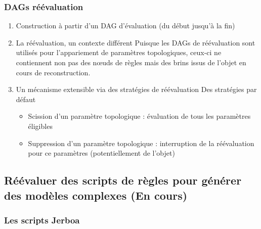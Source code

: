\documentclass[11pt]{article}
\begin{document}
\subsubsection{DAGs réévaluation}
\label{sec:orga954360}
\begin{enumerate}
\item Construction à partir d'un DAG d'évaluation (du début jusqu'à la fin)
\label{sec:org02d5b93}
\item La réévaluation, un contexte différent
\label{sec:org039e316}
Puisque les DAGs de réévaluation sont utilisés pour l'appariement de paramètres
topologiques, ceux-ci ne contiennent non pas des nœuds de règles mais des brins
issus de l'objet en cours de reconstruction.
\item Un mécanisme extensible via des stratégies de réévaluation
\label{sec:orgd4e36d0}
Des stratégies par défaut
\begin{itemize}
\item Scission d'un paramètre topologique : évaluation de tous les paramètres éligibles
\item Suppression d'un paramètre topologique : interruption de la réévaluation pour ce paramètres (potentiellement de l'objet)
\end{itemize}
\end{enumerate}
\subsection{Réévaluer des scripts de règles pour générer des modèles complexes (En cours)}
\label{sec:orga3ae81b}
\subsubsection{Les scripts Jerboa}
\label{sec:org9689965}
\end{document}
